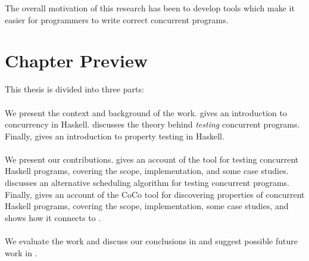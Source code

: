 The overall motivation of this research has been to develop tools
which make it easier for programmers to write correct concurrent
programs.

\section{Chapter Preview}
\label{sec:intro-roadmap}

This thesis is divided into three parts:

\paragraph{}
We present the context and background of the work.
 gives an introduction to concurrency in
Haskell.   discusses the theory behind \emph{testing}
concurrent programs.  Finally,  gives an
introduction to property testing in Haskell.

\paragraph{}
We present our contributions.   gives an account of
the \dejafu{} tool for testing concurrent Haskell programs, covering
the scope, implementation, and some case studies.
 discusses an alternative scheduling algorithm
for testing concurrent programs.  Finally,  gives an
account of the CoCo tool for discovering properties of concurrent
Haskell programs, covering the scope, implementation, some case
studies, and shows how it connects to \dejafu{}.

\paragraph{}
We evaluate the work and discuss our conclusions in
 and suggest possible future work in
.

